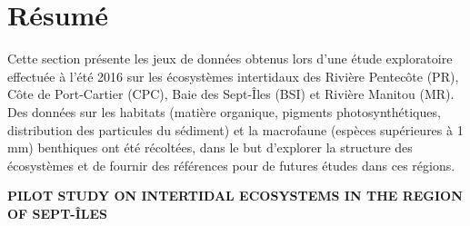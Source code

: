 \label{ann2}
\addtocounter{chapter}{1}
\setcounter{section}{0}

\section{Résumé}
Cette section présente les jeux de données obtenus lors d'une étude exploratoire effectuée à l'été 2016 sur les écosystèmes intertidaux des Rivière Pentecôte (PR), Côte de Port-Cartier (CPC), Baie des Sept-Îles (BSI) et Rivière Manitou (MR). Des données sur les habitats (matière organique, pigments photosynthétiques, distribution des particules du sédiment) et la macrofaune (espèces supérieures à 1 mm) benthiques ont été récoltées, dans le but d'explorer la structure des écosystèmes et de fournir des références pour de futures études dans ces régions.

\clearpage

\begin{center}
\textbf{PILOT STUDY ON INTERTIDAL ECOSYSTEMS IN THE REGION OF SEPT-ÎLES}
\end{center}
